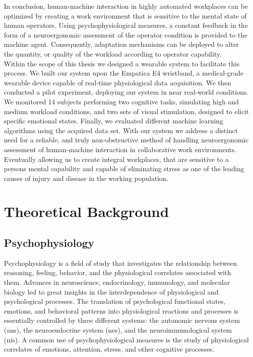 In conclusion, human-machine interaction in highly automated workplaces can be optimized by creating a work environment that is sensitive to the mental state of human operators. Using psychophysiological measures, a constant feedback in the form of a neuroergonomic assessment of the operator condition is provided to the machine agent. Consequently, adaptation mechanisms can be deployed to alter the quantity, or quality of the workload according to operator capability.\\ 
Within the scope of this thesis we designed a wearable system to facilitate this process. We built our system upon the Empatica E4 wristband, a medical-grade wearable device capable of real-time physiological data acquisition. We then conducted a pilot experiment, deploying our system in near real-world conditions. We monitored 14 subjects performing two cognitive tasks, simulating high and medium workload conditions, and two sets of visual stimulation, designed to elicit specific emotional states. Finally, we evaluated different machine learning algorithms using the acquired data set. With our system we address a distinct need for a reliable, and truly non-obstructive method of handling neuroergonomic assessment of human-machine interaction in collaborative work environments. Eventually allowing us to create integral workplaces, that are sensitive to a persons mental capability and capable of eliminating stress as one of the leading causes of injury and disease in the working population.
\section{Theoretical Background}
\subsection{Psychophysiology}
Psychophysiology is a field of study that investigates the relationship between reasoning, feeling, behavior, and the physiological correlates associated with them. Advances in neuroscience, endocrinology, immunology, and molecular biology led to great insights in the interdependence of physiological and psychological processes. The translation of psychological functional states, emotions, and behavioral patterns into physiological reactions and processes is essentially controlled by three different systems: the autonomic nervous system (\gls{ans}), the neuroendocrine system (\gls{nes}), and the neuroimmunological system (\gls{nis}). A common use of psychophysiological measures is the study of physiological correlates of emotions, attention, stress, and other cognitive processes.  

